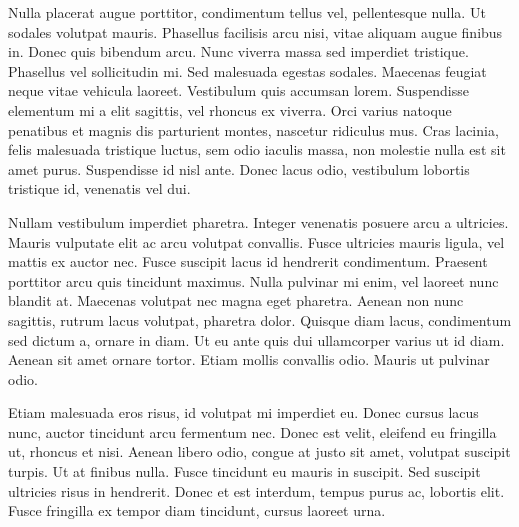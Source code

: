 Nulla placerat augue porttitor, condimentum tellus vel, pellentesque nulla. Ut sodales volutpat mauris. Phasellus facilisis arcu nisi, vitae aliquam augue finibus in. Donec quis bibendum arcu. Nunc viverra massa sed imperdiet tristique. Phasellus vel sollicitudin mi. Sed malesuada egestas sodales. Maecenas feugiat neque vitae vehicula laoreet. Vestibulum quis accumsan lorem. Suspendisse elementum mi a elit sagittis, vel rhoncus ex viverra. Orci varius natoque penatibus et magnis dis parturient montes, nascetur ridiculus mus. Cras lacinia, felis malesuada tristique luctus, sem odio iaculis massa, non molestie nulla est sit amet purus. Suspendisse id nisl ante. Donec lacus odio, vestibulum lobortis tristique id, venenatis vel dui.

Nullam vestibulum imperdiet pharetra. Integer venenatis posuere arcu a ultricies. Mauris vulputate elit ac arcu volutpat convallis. Fusce ultricies mauris ligula, vel mattis ex auctor nec. Fusce suscipit lacus id hendrerit condimentum. Praesent porttitor arcu quis tincidunt maximus. Nulla pulvinar mi enim, vel laoreet nunc blandit at. Maecenas volutpat nec magna eget pharetra. Aenean non nunc sagittis, rutrum lacus volutpat, pharetra dolor. Quisque diam lacus, condimentum sed dictum a, ornare in diam. Ut eu ante quis dui ullamcorper varius ut id diam. Aenean sit amet ornare tortor. Etiam mollis convallis odio. Mauris ut pulvinar odio.

Etiam malesuada eros risus, id volutpat mi imperdiet eu. Donec cursus lacus nunc, auctor tincidunt arcu fermentum nec. Donec est velit, eleifend eu fringilla ut, rhoncus et nisi. Aenean libero odio, congue at justo sit amet, volutpat suscipit turpis. Ut at finibus nulla. Fusce tincidunt eu mauris in suscipit. Sed suscipit ultricies risus in hendrerit. Donec et est interdum, tempus purus ac, lobortis elit. Fusce fringilla ex tempor diam tincidunt, cursus laoreet urna.